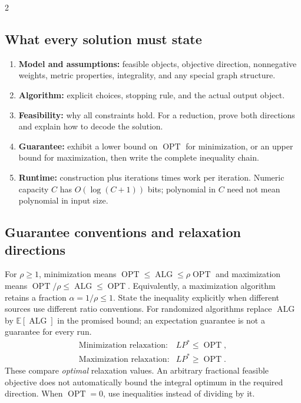 \documentclass[10pt]{article}
\theoremstyle{definition}
\newcommand{\OPT}{\operatorname{OPT}}
\newcommand{\ALG}{\operatorname{ALG}}
\begin{document}
\begin{multicols*}{2}
\subsection{What every solution must state}
\begin{enumerate}
\item \textbf{Model and assumptions:} feasible objects, objective direction, nonnegative
weights, metric properties, integrality, and any special graph structure.
\item \textbf{Algorithm:} explicit choices, stopping rule, and the actual output object.
\item \textbf{Feasibility:} why all constraints hold. For a reduction, prove both directions
and explain how to decode the solution.
\item \textbf{Guarantee:} exhibit a lower bound on $\OPT$ for minimization, or an upper
bound for maximization, then write the complete inequality chain.
\item \textbf{Runtime:} construction plus iterations times work per iteration. Numeric
capacity $C$ has $O(\log(C+1))$ bits; polynomial in $C$ need not mean polynomial in input size.
\end{enumerate}

\subsection{Guarantee conventions and relaxation directions}
For $\rho\ge1$, minimization means $\OPT\le\ALG\le\rho\OPT$ and maximization means
$\OPT/\rho\le\ALG\le\OPT$. Equivalently, a maximization algorithm retains a fraction
$\alpha=1/\rho\le1$. State the inequality explicitly when different sources use different
ratio conventions. For randomized algorithms replace $\ALG$ by $\mathbb E[\ALG]$ in the
promised bound; an expectation guarantee is not a guarantee for every run.
\[
\begin{array}{ll}
\text{Minimization relaxation:}&LP^*\le\OPT,\\
\text{Maximization relaxation:}&LP^*\ge\OPT.
\end{array}
\]
These compare \emph{optimal} relaxation values. An arbitrary fractional feasible objective
does not automatically bound the integral optimum in the required direction. When $\OPT=0$,
use inequalities instead of dividing by it.


\end{multicols*}
\end{document}
